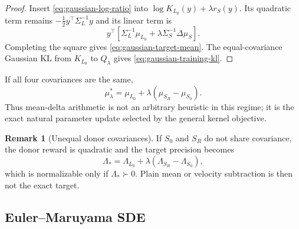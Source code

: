 \documentclass[11pt,a4paper]{article}
\newcommand{\Sbase}{S_0}
\newcommand{\Srl}{S_R}
\newcommand{\Lbase}{L_0}
\newcommand{\Lactor}{L_\theta}
\newcommand{\dmuS}{\Delta\mu_S}
\theoremstyle{plain}
\theoremstyle{definition}
\newtheorem{remark}[theorem]{Remark}
\begin{document}
\begin{proof}
Insert \eqref{eq:gaussian-log-ratio} into
$\log K_{\Lbase}(y)+\lambda r_S(y)$.  Its quadratic term remains
$-\tfrac12 y^\top\Sigma_L^{-1}y$ and its linear term is
\[
y^\top
\left[
\Sigma_L^{-1}\mu_{\Lbase}
+\lambda\Sigma_S^{-1}\dmuS
\right].
\]
Completing the square gives \eqref{eq:gaussian-target-mean}.  The equal-covariance Gaussian KL
from $K_{\Lactor}$ to $Q_\lambda$ gives \eqref{eq:gaussian-training-kl}.
\end{proof}

If all four covariances are the same,
\begin{equation}
\boxed{
\mu_\lambda^*
=
\mu_{\Lbase}
+\lambda(\mu_{\Srl}-\mu_{\Sbase}).
}
\label{eq:equal-covariance-target}
\end{equation}
Thus mean-delta arithmetic is not an arbitrary heuristic in this regime; it is the exact natural
parameter update selected by the general kernel objective.

\begin{remark}[Unequal donor covariances]
If $\Sbase$ and $\Srl$ do not share covariance, the donor reward is quadratic and the target
precision becomes
\begin{equation}
\Lambda_*
=
\Lambda_{\Lbase}
+\lambda(\Lambda_{\Srl}-\Lambda_{\Sbase}),
\label{eq:unequal-precision}
\end{equation}
which is normalizable only if $\Lambda_*\succ0$.  Plain mean or velocity subtraction is then not
the exact target.
\end{remark}

\subsection{Euler--Maruyama SDE}
\end{document}
